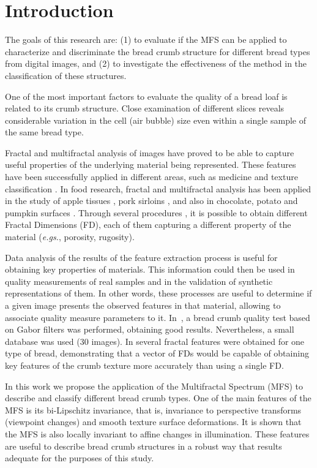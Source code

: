 \section{Introduction}
\label{intro}
The goals of this research are: (1) to evaluate if the MFS can be applied to characterize and discriminate the bread crumb structure for different bread types from digital images, and (2) to investigate the effectiveness of the method in the classification of these structures.

One of the most important factors to evaluate the quality of a bread loaf is related to its crumb structure. Close examination of different slices reveals considerable variation in the cell (air bubble) size even within a single sample of the same bread type. 

Fractal and multifractal analysis of images have pro\-ved to be able to capture useful properties of the underlying material being represented. These features have been successfully applied in different areas, such as medi\-cine \cite{Andjelkovic2008,Yu2011} and texture classification \cite{Wendt2009}. In food research, fractal and multifractal analysis has been applied in the study of apple tissues \cite{Mendoza2010}, pork sirloins \cite{Serrano2012}, and also in chocolate, potato and pumpkin surfaces \cite{Quevedo2002}. Through several procedures \cite{Peitgen2004,Gonzales2008}, it is possible to obtain different Fractal Dimensions (FD), each of them capturing a different property of the material ({\em e.gs.}, porosity, rugosity).

Data analysis of the results of the feature extraction process is useful for obtaining key properties of materials. This information could then be used in quality measurements of real samples and in the validation of synthetic representations of them. In other words, these processes are useful to determine if a given image presents the observed features in that material, allowing to associate quality measure parameters to it. In~\cite{Fan2006}, a bread crumb quality test based on Gabor filters was performed, obtaining good results. Nevertheless, a small database was used ($30$ images). In \cite{Gonzales2008} several fractal features were obtained for one type of bread, demonstrating that a vector of FDs would be capable of obtaining key features of the crumb texture more accurately than using a single FD.

In this work we propose the application of the Multifractal Spectrum (MFS) \cite{Xu2009} to describe and classify different bread crumb types. One of the main features of the MFS is its bi-Lipschitz invariance, that is, invariance to perspective transforms (viewpoint changes) and smooth texture surface deformations. It is shown that the MFS is also locally invariant to affine changes in illumination. These features are useful to describe bread crumb structures in a robust way that results adequate for the purposes of this study.

